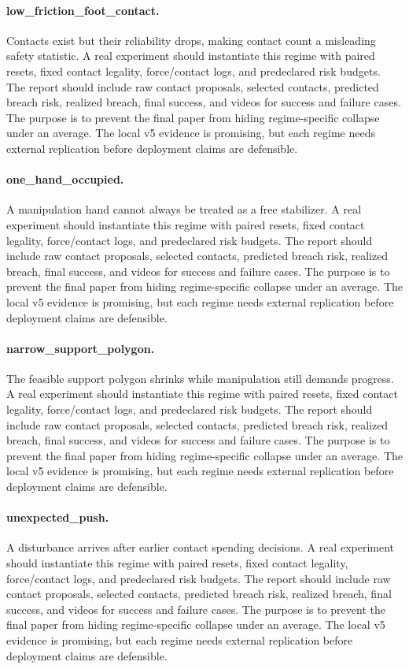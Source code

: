 \documentclass{article}
\begin{document}
\paragraph{low\_friction\_foot\_contact.} Contacts exist but their reliability drops, making contact count a misleading safety statistic. A real experiment should instantiate this regime with paired resets, fixed contact legality, force/contact logs, and predeclared risk budgets. The report should include raw contact proposals, selected contacts, predicted breach risk, realized breach, final success, and videos for success and failure cases.
The purpose is to prevent the final paper from hiding regime-specific collapse under an average. The local v5 evidence is promising, but each regime needs external replication before deployment claims are defensible.
\paragraph{one\_hand\_occupied.} A manipulation hand cannot always be treated as a free stabilizer. A real experiment should instantiate this regime with paired resets, fixed contact legality, force/contact logs, and predeclared risk budgets. The report should include raw contact proposals, selected contacts, predicted breach risk, realized breach, final success, and videos for success and failure cases.
The purpose is to prevent the final paper from hiding regime-specific collapse under an average. The local v5 evidence is promising, but each regime needs external replication before deployment claims are defensible.
\paragraph{narrow\_support\_polygon.} The feasible support polygon shrinks while manipulation still demands progress. A real experiment should instantiate this regime with paired resets, fixed contact legality, force/contact logs, and predeclared risk budgets. The report should include raw contact proposals, selected contacts, predicted breach risk, realized breach, final success, and videos for success and failure cases.
The purpose is to prevent the final paper from hiding regime-specific collapse under an average. The local v5 evidence is promising, but each regime needs external replication before deployment claims are defensible.
\paragraph{unexpected\_push.} A disturbance arrives after earlier contact spending decisions. A real experiment should instantiate this regime with paired resets, fixed contact legality, force/contact logs, and predeclared risk budgets. The report should include raw contact proposals, selected contacts, predicted breach risk, realized breach, final success, and videos for success and failure cases.
The purpose is to prevent the final paper from hiding regime-specific collapse under an average. The local v5 evidence is promising, but each regime needs external replication before deployment claims are defensible.
\end{document}
